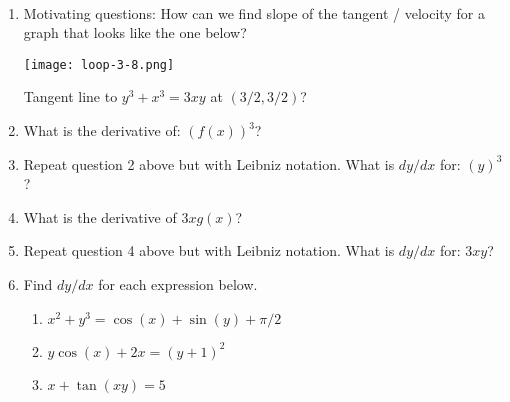 \documentclass[11pt,fleqn]{article}
\begin{document}
\renewcommand{\headrulewidth}{0pt}
\newcommand{\blank}[1]{\rule{#1}{0.75pt}}
\newcommand{\bc}{\begin{center}}
\newcommand{\ec}{\end{center}}
\renewcommand{\d}{\displaystyle}

\vspace*{-0.7in}

\begin{center}
  \large
  \\
\end{center}
\begin{enumerate}
\item Motivating questions: How can we find slope of the tangent / velocity for a graph that looks like the one below?\\

\begin{multicols}{2}
\texttt{[image: loop-3-8.png]}

Tangent line to $y^3+x^3=3xy$ at $(3/2,3/2)$?

\end{multicols}

\vspace{1in}
 
 \item What is the derivative of: \quad \large{${\displaystyle{\left(f(x) \right)^3}}$}\quad?\\
 
 \vfill
 
 \item Repeat question 2 above but with Leibniz notation. What is $dy/dx$ for: \quad \large{${\displaystyle{\left(y \right)^3}}$}\quad?\\
 
  \vfill
 
 \item What is the derivative of  \quad \large{${\displaystyle{ 3xg(x)}}$}\quad?\\
 
  \vfill
 
 \item Repeat question 4 above but with Leibniz notation. What is $dy/dx$ for: \quad \large{${\displaystyle{3xy}}$}\quad?\\
 
  \vfill
  
  \newpage
  \item Find $dy/dx$ for each expression below.
  	\begin{enumerate}
	\item $x^2+y^3=\cos(x)+\sin(y) + \pi/2$
	\vfill
	\item $y \cos(x) +2x=(y+1)^2$
	\vfill
	\item $x+\tan(xy)=5$
	\vfill
	\end{enumerate}


\end{enumerate}
\end{document}
